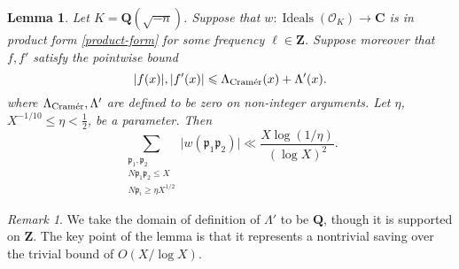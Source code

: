 \documentclass[11pt,reqno]{amsart}
\numberwithin{equation}{section}
\newtheorem{lemma}[theorem]{Lemma}
\theoremstyle{definition}
\theoremstyle{remark}
\newtheorem*{remark}{Remark}
\newcommand{\mf}{\mathfrak}
\renewcommand{\le}{\leqslant}
\renewcommand{\ge}{\geqslant}
\newcommand\Z{\mathbf{Z}}
\newcommand\Q{\mathbf{Q}}
\newcommand\C{\mathbf{C}}
\newcommand\cramer{{\textnormal{Cram\'er}}}
\newcommand\Ideals{\operatorname{Ideals}}
\renewcommand\O{\mathcal{O}}
\begin{document}
\begin{lemma}\label{lem:2primes-upper-bound}
Let $K = \Q(\sqrt{-n})$. Suppose that $w : \Ideals(\O_K) \rightarrow \C$ is in product form \cref{product-form} for some frequency $\ell \in \Z$. Suppose moreover that $f, f'$ satisfy the pointwise bound
\begin{equation}\label{w-cond} |f(x)|, |f'(x)|  \le \Lambda_{\cramer}(x) + \Lambda'(x).\end{equation} where $\Lambda_{\cramer}, \Lambda'$ are defined to be zero on non-integer arguments. Let $\eta$, $X^{-1/10} \le \eta < \frac{1}{2}$, be a parameter. Then 
\[ \sum_{\substack{\mf{p}_1,\mf{p}_2\\ N\mf{p}_1\mf{p}_2 \le X \\ N\mf{p}_i \ge \eta X^{1/2}} }\big|w(\mf{p}_1\mf{p}_2)\big|\ll \frac{X \log(1/\eta)}{(\log X)^2}.\]
\end{lemma}
\begin{remark} We take the domain of definition of $\Lambda'$ to be $\Q$, though it is supported on $\Z$.
 The key point of the lemma is that it represents a nontrivial saving over the trivial bound of $O(X/\log X)$.
\end{remark}
\end{document}
